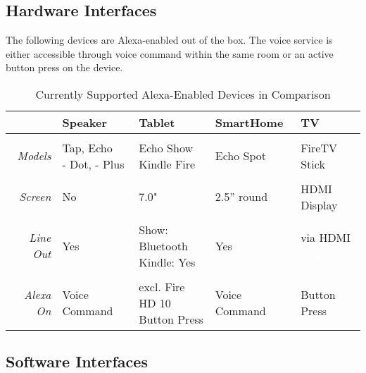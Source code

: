 \subsection*{Hardware Interfaces}

The following devices are Alexa-enabled out of the box. The voice service is either accessible through voice command within the same room or an active button press on the device.

\begin{table}[htbp!]
	\caption[Alexa Devices in Comparision]{Currently Supported Alexa-Enabled Devices in Comparison}\label{alexaDeviceTable}
	\begin{tabularx}{\textwidth}{  r | l l l l  }
		
				& Speaker							& Tablet	& SmartHome	& TV	\\ \hline \hline \\
		\textit{Models}	& \shortstack[l]{Tap, Echo \\ - Dot, - Plus}     & \shortstack[l]{Echo Show \\ Kindle Fire}    & Echo Spot & FireTV Stick \\ \hline \\
		\textit{Screen}  		& No      & 7.0" 		& 2.5'' round				&  HDMI Display      \\ \hline \\
		\textit{Line Out}		& Yes      					        & \shortstack[l]{Show: Bluetooth \\ Kindle: Yes} & 	Yes & \shortstack{via HDMI \\ \textcolor{white}{text} }      \\ \hline \\
		\textit{Alexa On} 	& Voice	Command					&
		\shortstack[l]{excl. Fire HD 10\\Button Press}
		& Voice Command & %
		Button Press
	\end{tabularx}
\end{table}





\subsection*{Software Interfaces}



